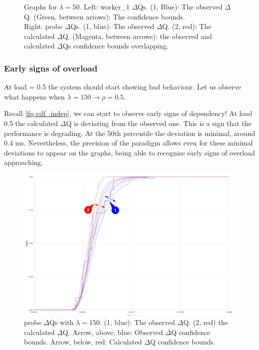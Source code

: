 \begin{figure}[H]
\begin{subfigure}{.5\textwidth}
                \label{fig:norm_ex_2}
            \end{subfigure}
            \label{fig:norm_ex}
            \caption{Graphs for $\lambda = 50$. Left: worker\_1 $\Delta$Qs. (1, Blue): The observed $\Delta$Q. (Green, between arrows): The confidence bounds. \\
            Right: probe $\Delta$Qs. (1, blue): The observed $\Delta$Q. (2, red): The calculated $\Delta$Q. (Magenta, between arrows): the observed and calculated $\Delta$Qs confidence bounds overlapping.}
        \end{figure}
    
\subsubsection{Early signs of overload}
    
    At load = 0.5 the system should start showing bad behaviour. Let us observe what happens when $\lambda = 150 \rightarrow \rho = 0.5$.
    
    Recall \ref{fig:cdf_indep}, we can start to observe early signs of dependency! At load 0.5 the calculated $\Delta$Q is deviating from the observed one. This is a sign that the performance is degrading. At the 50th percentile the deviation is minimal, around 0.4 ms. Nevertheless, the precision of the paradigm allows even for these minimal deviations to appear on the graphs, being able to recognise early signs of overload approaching.

    \begin{figure}[H]
        \begin{center}
        \includegraphics[scale = 0.25]{img/overload_2/150_probe2.pdf}
        \end{center}
            \caption{probe $\Delta$Qs with $\lambda = 150$. (1, blue): The observed $\Delta$Q. (2, red) the calculated $\Delta$Q. Arrow, above, blue: Observed $\Delta$Q confidence bounds. Arrow, below, red: Calculated $\Delta$Q confidence bounds.}%
        \label{fig:early_ov}
    \end{figure}
 
